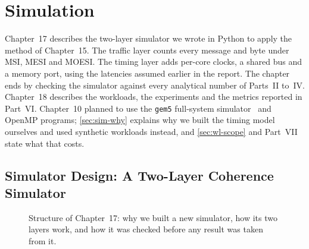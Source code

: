 
\part{Simulation}
\label{part:simulation}

\begin{center}
\end{center}

\begin{keybox}
Chapter~17 describes the two-layer simulator we wrote in Python to apply the
method of Chapter~15. The traffic layer counts every message and byte under MSI,
MESI and MOESI. The timing layer adds per-core clocks, a shared bus and a memory
port, using the latencies assumed earlier in the report. The chapter ends by
checking the simulator against every analytical number of Parts~II to~IV.
Chapter~18 describes the workloads, the experiments and the metrics reported in
Part~VI. Chapter~10 planned to use the \texttt{gem5} full-system
simulator~\cite{binkert2011gem5} and OpenMP programs; \cref{sec:sim-why} explains
why we built the timing model ourselves and used synthetic workloads instead, and
\cref{sec:wl-scope} and Part~VII state what that costs.
\end{keybox}

\chapter{Simulator Design: A Two-Layer Coherence Simulator}
\label{ch:simulator}

\begin{figure}[htbp]
\centering
{}
\caption[]{Structure of Chapter~17: why we built a new
simulator, how its two layers work, and how it was checked before any result was
taken from it.}
\label{fig:ch17-map}
\end{figure}

